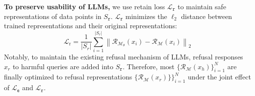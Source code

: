 \textbf{To preserve usability of LLMs,} we use retain loss $\mathcal{L}_\texttt{r}$ to maintain safe representations of data points in $S_\texttt{r}$.
%
$\mathcal{L}_\texttt{r}$ minimizes the $\ell_2$ distance between trained representations and their original representations:
\begin{equation}
\mathcal{L}_\text{r} = \frac{1}{\left|S_r\right|}\sum_{i=1}^{\left|S_r\right|} \left\| \mathcal{R}_{\mathcal{M}_\theta} \left(x_i \right) - \mathcal{R}_\mathcal{M} \left(x_i \right) \right\|_2
\end{equation}
%
Notably, to maintain the existing refusal mechanism of LLMs, refusal responses $x_r$ to harmful queries are added into $S_\texttt{r}$.
%
Therefore, most $\{\mathcal{R}_\mathcal{M} \left(x_h \right)\}_{i=1}^N$ are finally optimized to refusal representations $\{\mathcal{R}_\mathcal{M} \left(x_r \right)\}\}_{i=1}^N$ under the joint effect of $\mathcal{L}_\texttt{e}$ and $\mathcal{L}_\texttt{r}$.

